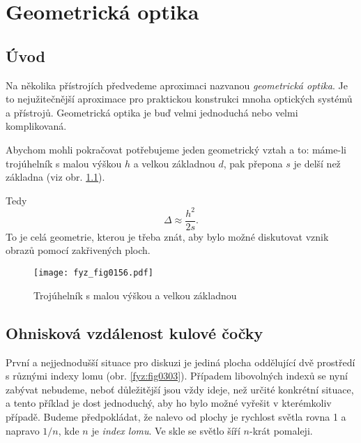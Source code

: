 \setchaptertoc
\chapter{Geometrická optika}\label{fyz:IchapXXVII}


  \section{Úvod}\label{fyz:IchapXXVIIsecI}
    Na několika přístrojích předvedeme aproximaci nazvanou \emph{geometrická optika}. Je to
    nejužitečnější aproximace pro praktickou konstrukci mnoha optických systémů a přístrojů.
    Geometrická optika je buď velmi jednoduchá nebo velmi komplikovaná.
    
    Abychom mohli pokračovat potřebujeme jeden geometrický vztah a to: máme-li trojúhelník s malou
    výškou $h$ a velkou základnou $d$, pak přepona $s$ je delší než základna (viz obr.
    \ref{fyz:fig0156}).  
    
    Tedy 
    \begin{equation}\label{fyz:eq_triangle}
     \Delta \approx \frac{h^2}{2s}.
    \end{equation}
    To je celá geometrie, kterou je třeba znát, aby bylo možné diskutovat vznik obrazů pomocí
    zakřivených ploch.
    
    \begin{figure}[ht!] %
      \centering
      \texttt{[image: fyz\_fig0156.pdf]}
      \caption{Trojúhelník s malou výškou a velkou základnou
               \cite[s.~358]{Feynman01}}
      \label{fyz:fig0156}  
    \end{figure}

  \section{Ohnisková vzdálenost kulové čočky}\label{fyz:IchapXXVIIsecII}
    První a nejjednodušší situace pro diskuzi je jediná plocha oddělující dvě prostředí s různými 
    indexy lomu (obr. \ref{fyz:fig0303}). Případem libovolných indexů se nyní zabývat nebudeme, 
    neboť důležitější jsou vždy ideje, než určité konkrétní situace, a tento příklad je dost 
    jednoduchý, aby ho bylo možné vyřešit v kterémkoliv případě. Budeme předpokládat, že nalevo od 
    plochy je rychlost světla rovna \num{1} a napravo \(1/n\), kde \(n\) je \emph{index lomu}. Ve 
    skle se světlo šíří \(n\)-krát pomaleji.

